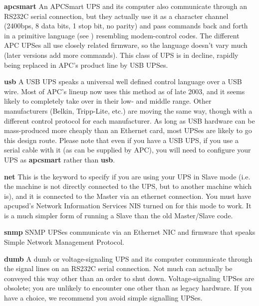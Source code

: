 \begin{description}

\item {\bf apcsmart}
An APCSmart UPS and its computer also communicate through an RS232C serial
connection, but they actually use it as a character channel (2400bps, 8 data
bits, 1 stop bit, no parity) and pass commands back and forth in a primitive
language (see 
) resembling
modem-control codes.  The different APC UPSes all use closely related
firmware, so the language doesn't vary much (later versions add more
commands).  This class of UPS is in decline, rapidly being replaced in APC's
product line by USB UPSes.  

\item {\bf usb}
A USB UPS speaks a universal well defined control language over a USB wire. 
Most of APC's lineup now uses this method as of late 2003, and it seems likely
to completely take over in their low- and middle range.  Other manufacturers
(Belkin, Tripp-Lite, etc.) are moving the same way, though with a different
control protocol for each manufacturer.  As long as USB hardware can be
mass-produced more cheaply than an Ethernet card, most UPSes are likely to go
this design route. Please note that even if you have a USB UPS, if you use a
serial cable with it (as can be supplied by APC), you will need to configure
your UPS as {\bf apcsmart} rather than {\bf usb}.  

\item {\bf net}
This is the keyword to specify if you are using your UPS in Slave mode (i.e.
the machine is not directly connected to the UPS, but to another machine which
is), and it is connected to the Master via an ethernet connection. You must
have apcupsd's Network Information Services NIS turned on for this mode to
work. It is a much simpler form of running a Slave than the old Master/Slave
code.  

\item {\bf snmp}
SNMP UPSes communicate via an Ethernet NIC and firmware that speaks Simple
Network Management Protocol.  

\item {\bf dumb}
A dumb or voltage-signaling UPS and its computer communicate through the
signal lines on an RS232C serial connection.  Not much can actually be
conveyed this way other than an order to shut down. Voltage-signaling UPSes
are obsolete; you are unlikely to encounter one other than as legacy hardware.
If you have a choice, we recommend you avoid simple signalling UPSes.  
\end{description}

